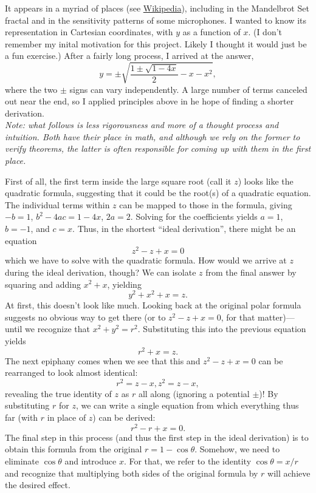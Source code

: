 \documentclass{article}
\begin{document}
It appears in a myriad of places (see \href{https://en.wikipedia.org/wiki/Cardioid#Properties}{Wikipedia}),
including in the Mandelbrot Set fractal and in the sensitivity patterns of some microphones.
I wanted to know its representation in Cartesian coordinates, with $y$ as a function of $x$.
(I don't remember my inital motivation for this project.
Likely I thought it would just be a fun exercise.)
After a fairly long process, I arrived at the answer,
\[y = \pm\sqrt{\frac{1\pm\sqrt{1-4x}}{2}-x-x^2},\]
where the two $\pm$ signs can vary independently.
A large number of terms canceled out near the end,
so I applied principles above
in he hope of finding a shorter derivation.\\

\textit{Note: what follows is less rigorousness and more of a thought process and intuition.
  Both have their place in math, and although we rely on the former to verify theorems,
  the latter is often responsible for coming up with them in the first place.\\
}

First of all, the first term inside the large square root (call it $z$) looks like the quadratic formula,
suggesting that it could be the root(s) of a quadratic equation.
The individual terms within $z$ can be mapped to those in the formula, giving
$-b=1$, $b^2-4ac=1-4x$, $2a=2$.
Solving for the coefficients yields $a=1$, $b=-1$, and $c=x$.
Thus, in the shortest ``ideal derivation'', there might be an equation
\[z^2-z+x=0\]
which we have to solve with the quadratic formula.
How would we arrive at $z$ during the ideal derivation, though?
We can isolate $z$ from the final answer by squaring and adding $x^2+x$, yielding
\[y^2+x^2+x=z.\]
At first, this doesn't look like much.
Looking back at the original polar formula
suggests no obvious way to get there
(or to $z^2-z+x=0$, for that matter)---until we recognize that $x^2+y^2=r^2$.
Substituting this into the previous equation yields
\[r^2+x=z.\]
The next epiphany comes when we see that this and $z^2-z+x=0$ can be rearranged to look almost identical:
\[r^2=z-x, z^2=z-x,\]
revealing the true identity of $z$ as $r$ all along
(ignoring a potential $\pm$)!
By substituting $r$ for $z$, we can write a single equation from which everything thus far (with $r$ in place of $z$) can be derived:
\[r^2-r+x=0.\]
The final step in this process (and thus the first step in the ideal derivation)
is to obtain this formula from the original $r=1-\cos\theta$.
Somehow, we need to eliminate $\cos\theta$ and introduce $x$.
For that, we refer to the identity $\cos\theta=x/r$
and recognize that multiplying both sides of the original formula by $r$
will achieve the desired effect.\\
\end{document}
